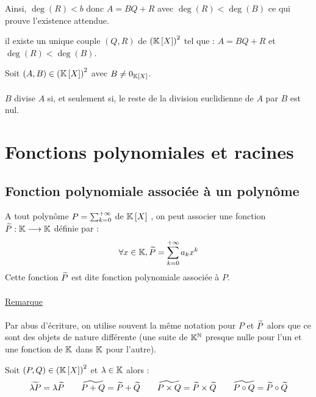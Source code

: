 \begin{dem}
\begin{itemize}
        Ainsi, \(\deg (R) < b\) donc \(A = BQ + R\) avec \(\deg(R) < \deg (B)\) ce qui prouve l’existence attendue.
    \end{itemize}
    \conclusion il existe un unique couple \((Q, R)\) de \(\left(\mathbb{K} \left[X\right]\right)^2\) tel que : \(A = BQ + R\) et \(\deg(R) < \deg(B)\).
\end{dem}

\begin{defprop}
    Soit \(\left(A,B\right) \in \left(\mathbb{K} \left[X\right]\right)^2 \) avec \(B\neq 0_{\mathbb{K}\left[X\right]}\).\\~\\
    \(B\) divise \(A\) si, et seulement si, le reste de la division euclidienne de \(A\) par \(B\) est nul.
\end{defprop}

\section{Fonctions polynomiales et racines}
\subsection{Fonction polynomiale associée à un polynôme}
\begin{defi}
    A tout polynôme \(P= \sum_{k=0}^{+\infty}\) de \(\mathbb{K} \left[X\right]\) , on peut associer une fonction \(\widetilde{P} : \mathbb{K} \longrightarrow \mathbb{K}\) définie par :
    \[ \forall x \in \mathbb{K}, \widetilde{P} = \sum_{k=0}^{+\infty} a_k x^k\]
    Cette fonction \(\widetilde{P}\) est dite fonction polynomiale associée à \(P\).\\~\\
    \underline{Remarque}\\~\\
    Par abus d’écriture, on utilise souvent la même notation pour \(P\) et \(\widetilde{P}\) alors que ce sont des objets de nature différente (une suite de \(\mathbb{K}^{\mathbb{N}}\) presque nulle pour l’un et une fonction de \(\mathbb{K}\) dans \(\mathbb{K}\) pour l’autre).
\end{defi}

\begin{prop}
        Soit \(\left(P,Q\right) \in \left(\mathbb{K} \left[X\right]\right)^2 \) et \(\lambda \in \mathbb{K}\) alors : 
        \[ \widetilde{\lambda P} = \lambda \widetilde{P} \qquad \widetilde{P +Q} = \widetilde{P} + \widetilde{Q} \qquad \widetilde{P \times Q} = \widetilde{P} \times \widetilde{Q} \qquad \widetilde{P \circ Q} = \widetilde{P} \circ \widetilde{Q}\]
\end{prop}

